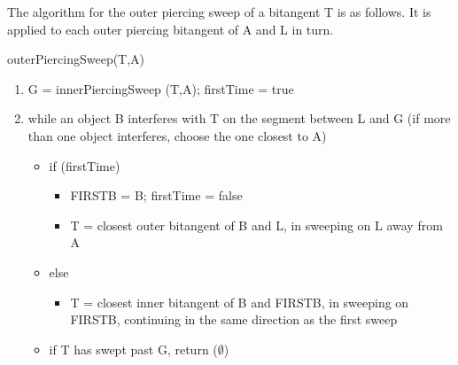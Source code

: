 \documentclass[9pt,twocolumn]{article}
\begin{document}

The algorithm for the outer piercing sweep of a bitangent T is as follows.
It is applied to each outer piercing bitangent of A and L in turn.

\vspace{.2in}

\centerline{outerPiercingSweep(T,A)}

\begin{enumerate}
\item G = innerPiercingSweep (T,A); firstTime = true
\item while an object B interferes with T on the segment between L and G
(if more than one object interferes, choose the one closest to A)
\begin{itemize}
\item if (firstTime)
\begin{itemize}
\item FIRSTB = B; firstTime = false
\item T = closest outer bitangent of B and L, 
      in sweeping on L away from A
\end{itemize}
\item else
\begin{itemize}
\item T = closest inner bitangent of B and FIRSTB, 
      in sweeping on FIRSTB, continuing in the same direction as the first sweep
\end{itemize}
\item if T has swept past G, return ($\emptyset$)
\end{itemize}



\end{enumerate}
\end{document}

